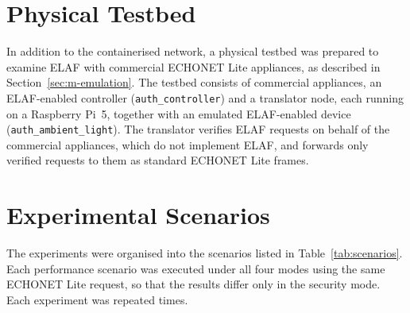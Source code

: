 \section{Physical Testbed}
\label{sec:i-testbed}

In addition to the containerised network, a physical testbed was prepared to examine ELAF with commercial ECHONET Lite appliances, as described in Section~\ref{sec:m-emulation}. The testbed consists of commercial appliances, an ELAF-enabled controller (\texttt{auth\_controller}) and a translator node, each running on a Raspberry Pi~5, together with an emulated ELAF-enabled device (\texttt{auth\_ambient\_light}). The translator verifies ELAF requests on behalf of the commercial appliances, which do not implement ELAF, and forwards only verified requests to them as standard ECHONET Lite frames.

\section{Experimental Scenarios}
\label{sec:i-scenarios}

The experiments were organised into the scenarios listed in Table~\ref{tab:scenarios}. Each performance scenario was executed under all four modes using the same ECHONET Lite request, so that the results differ only in the security mode. Each experiment was repeated \tbd{} times.

